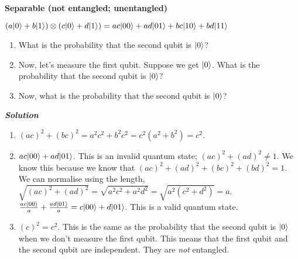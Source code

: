 \pagebreak

\begin{exercise}
    \textbf{Separable (not entangled; unentangled)}

    $(a\lvert0\rangle + b\lvert1\rangle) \otimes (c\lvert0\rangle + d\lvert1\rangle) = ac\lvert0 0\rangle + ad\lvert0 1\rangle + bc\lvert1 0\rangle + bd\lvert1 1\rangle$
    \begin{enumerate}
        \item What is the probability that the second qubit is $\lvert0\rangle$?
        \item Now, let's measure the first qubit. Suppose we get $\lvert0\rangle$. What is the probability that the second qubit is $\lvert0\rangle$?
        \item Now, what is the probability that the second qubit is $\lvert0\rangle$?
    \end{enumerate}
    \textbf{\emph{Solution}}
    \begin{enumerate}
        \item $(ac)^2 + (bc)^2 = a^2 c^2 + b^2 c^2 = c^2(a^2 + b^2) = c^2$.
        \item  $ac\lvert00\rangle + ad\lvert01\rangle$. This is an invalid quantum state; $(ac)^2 + (ad)^2 \neq 1$. We know this because we know that $(ac)^2 + (ad)^2 + (bc)^2 + (bd)^2 = 1$. We can normalise using the length, $\sqrt{(ac)^2 + (ad)^2} = \sqrt{a^2 c^2 + a^2 d^2} = \sqrt{a^2(c^2 + d^2)} = a$. $\frac{ac\lvert00\rangle}{a} + \frac{ad\lvert01\rangle}{a} = c\lvert00\rangle + d\lvert01\rangle$. This is a valid quantum state.
        \item $(c)^2 = c^2$. This is the same as the probability that the second qubit is $\lvert0\rangle$ when we don't measure the first qubit. This means that the first qubit and the second qubit are independent. They are \emph{not} entangled.
    \end{enumerate}
\end{exercise}

